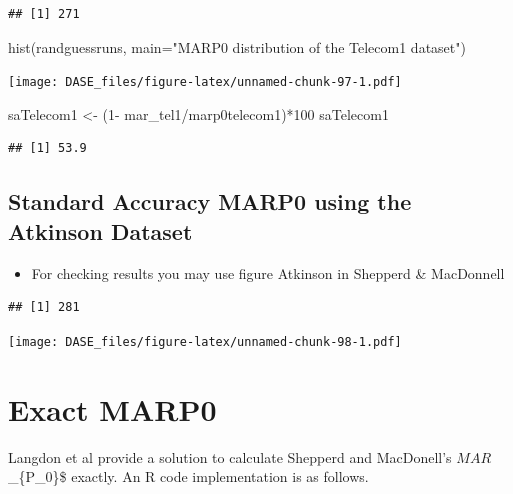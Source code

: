 \documentclass[
]{book}
\newenvironment{Shaded}{\begin{snugshade}}{\end{snugshade}}
\newcommand{\AttributeTok}[1]{\textcolor[rgb]{0.77,0.63,0.00}{#1}}
\newcommand{\DecValTok}[1]{\textcolor[rgb]{0.00,0.00,0.81}{#1}}
\newcommand{\FunctionTok}[1]{\textcolor[rgb]{0.00,0.00,0.00}{#1}}
\newcommand{\NormalTok}[1]{#1}
\newcommand{\OtherTok}[1]{\textcolor[rgb]{0.56,0.35,0.01}{#1}}
\newcommand{\SpecialCharTok}[1]{\textcolor[rgb]{0.00,0.00,0.00}{#1}}
\newcommand{\StringTok}[1]{\textcolor[rgb]{0.31,0.60,0.02}{#1}}
\providecommand{\tightlist}{%
  \setlength{\itemsep}{0pt}\setlength{\parskip}{0pt}}
\begin{document}
\begin{verbatim}
## [1] 271
\end{verbatim}

\begin{Shaded}
\begin{Highlighting}[]
\FunctionTok{hist}\NormalTok{(randguessruns, }\AttributeTok{main=}\StringTok{"MARP0 distribution of the Telecom1 dataset"}\NormalTok{)}
\end{Highlighting}
\end{Shaded}

\texttt{[image: DASE\_files/figure-latex/unnamed-chunk-97-1.pdf]}

\begin{Shaded}
\begin{Highlighting}[]
\NormalTok{saTelecom1 }\OtherTok{\textless{}{-}}\NormalTok{ (}\DecValTok{1}\SpecialCharTok{{-}}\NormalTok{ mar\_tel1}\SpecialCharTok{/}\NormalTok{marp0telecom1)}\SpecialCharTok{*}\DecValTok{100}
\NormalTok{saTelecom1}
\end{Highlighting}
\end{Shaded}

\begin{verbatim}
## [1] 53.9
\end{verbatim}

\hypertarget{standard-accuracy-marp0-using-the-atkinson-dataset}{%
\subsection{Standard Accuracy MARP0 using the Atkinson Dataset}\label{standard-accuracy-marp0-using-the-atkinson-dataset}}

\begin{itemize}
\tightlist
\item
  For checking results you may use figure Atkinson in Shepperd \& MacDonnell
\end{itemize}

\begin{verbatim}
## [1] 281
\end{verbatim}

\texttt{[image: DASE\_files/figure-latex/unnamed-chunk-98-1.pdf]}

\hypertarget{exact-marp0}{%
\section{Exact MARP0}\label{exact-marp0}}

Langdon et al\citeyearpar{Langdon2016} provide a solution to calculate Shepperd and MacDonell's \(MAR\)\_\{P\_0\}\$ exactly. An R code implementation is as follows.
\end{document}

